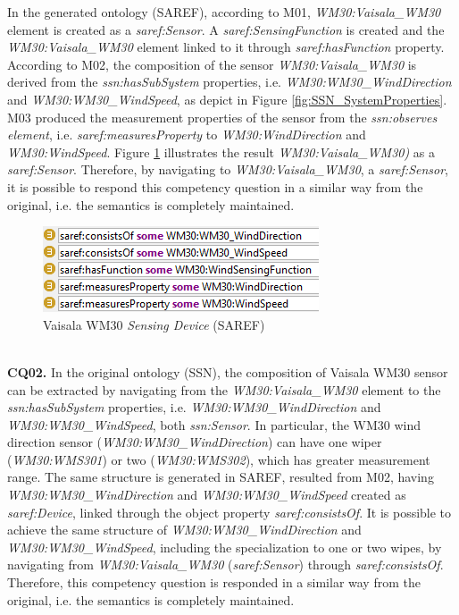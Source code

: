 \documentclass{sig-alternate-05-2015}
\begin{document}
In the generated ontology (SAREF), according to M01, \textit{WM30:\-Vaisala\-\_WM30} element is created as a \textit{saref:\-Sensor}. A \textit{saref:\-SensingFunction} is created and the \textit{WM30:\-Vaisala\-\_WM30} element linked to it through \textit{saref:\-hasFunction} property. According to M02, the composition of the sensor \textit{WM30:\-Vaisala\-\_WM30} is derived from the \textit{ssn:\-hasSubSystem} properties, i.e. \textit{WM30:\-WM30\-\_Wind\-Direction} and \textit{WM30:\-WM30\-\_WindSpeed}, as depict in Figure \ref{fig:SSN_SystemProperties}. M03 produced the measurement properties of the sensor from the \textit{ssn:\-observes element}, i.e. \textit{saref:\-measuresProperty} to \textit{WM30:\-WindDirection} and \textit{WM30:\-WindSpeed}. Figure \ref{fig:SAREF_Sensor_WM30} illustrates the result \textit{WM30:\-Vaisala\-\_WM30)} as a \textit{saref:\-Sensor}. Therefore, by navigating to \textit{WM30:\-Vaisala\-\_WM30}, a \textit{saref:\-Sensor}, it is possible to respond this competency question in a similar way from the original, i.e. the semantics is completely maintained.  
\begin{figure}[h!]
\centering
\includegraphics[scale=0.98]{SAREF_Sensor_WM30}
\caption{Vaisala WM30 \textit{Sensing Device} (SAREF)}
\label{fig:SAREF_Sensor_WM30}
\end{figure}
\\\textbf{CQ02.} In the original ontology (SSN), the composition of Vaisala WM30 sensor can be extracted by navigating from the \textit{WM30:\-Vaisala\-\_WM30} element to the \textit{ssn:\-hasSubSystem} properties, i.e. \textit{WM30:\-WM30\-\_Wind\-Direction} and \textit{WM30:\-WM30\-\_WindSpeed}, both \textit{ssn:\-Sensor}. In particular, the WM30 wind direction sensor (\textit{WM30:\-WM30\-\_Wind\-Direction}) can have one wiper (\textit{WM30:\-WMS301}) or two (\textit{WM30:\-WMS302}), which has greater measurement range. The same structure is generated in SAREF, resulted from M02, having \textit{WM30:\-WM30\-\_Wind\-Direction} and \textit{WM30:\-WM30\-\_WindSpeed} created as \textit{saref:\-Device}, linked through the object property \textit{saref:\-consistsOf}. It is possible to achieve the same structure of \textit{WM30:\-WM30\-\_Wind\-Direction} and \textit{WM30:\-WM30\-\_WindSpeed}, including the specialization to one or two wipes, by navigating from \textit{WM30:\-Vaisala\-\_WM30} (\textit{saref:\-Sensor}) through \textit{saref:\-consistsOf}. Therefore, this competency question is responded in a similar way from the original, i.e. the semantics is completely maintained.
\end{document}
